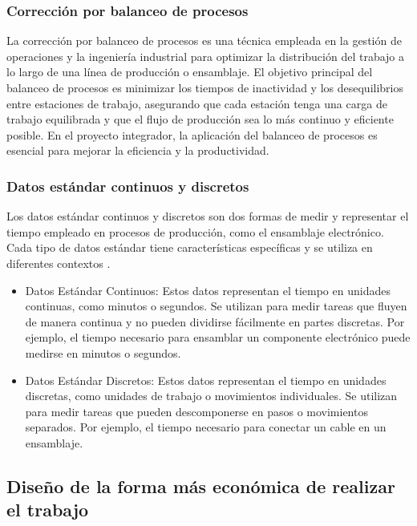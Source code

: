     \subsubsection{Corrección por balanceo de procesos}
    La corrección por balanceo de procesos es una técnica empleada en la gestión de operaciones y la ingeniería industrial para optimizar la distribución del trabajo a lo largo de una línea de producción o ensamblaje. El objetivo principal del balanceo de procesos es minimizar los tiempos de inactividad y los desequilibrios entre estaciones de trabajo, asegurando que cada estación tenga una carga de trabajo equilibrada y que el flujo de producción sea lo más continuo y eficiente posible. En el proyecto integrador, la aplicación del balanceo de procesos es esencial para mejorar la eficiencia y la productividad.
    \subsubsection{Datos estándar continuos y discretos}
    Los datos estándar continuos y discretos son dos formas de medir y representar el tiempo empleado en procesos de producción, como el ensamblaje electrónico. Cada tipo de datos estándar tiene características específicas y se utiliza en diferentes contextos .
    \begin{itemize}
    \item Datos Estándar Continuos: Estos datos representan el tiempo en unidades continuas, como minutos o segundos. Se utilizan para medir tareas que fluyen de manera continua y no pueden dividirse fácilmente en partes discretas. Por ejemplo, el tiempo necesario para ensamblar un componente electrónico puede medirse en minutos o segundos.
    
    \item Datos Estándar Discretos: Estos datos representan el tiempo en unidades discretas, como unidades de trabajo o movimientos individuales. Se utilizan para medir tareas que pueden descomponerse en pasos o movimientos separados. Por ejemplo, el tiempo necesario para conectar un cable en un ensamblaje.
    \end{itemize}
    
    \subsection{Diseño de la forma más económica de realizar el trabajo}
    
